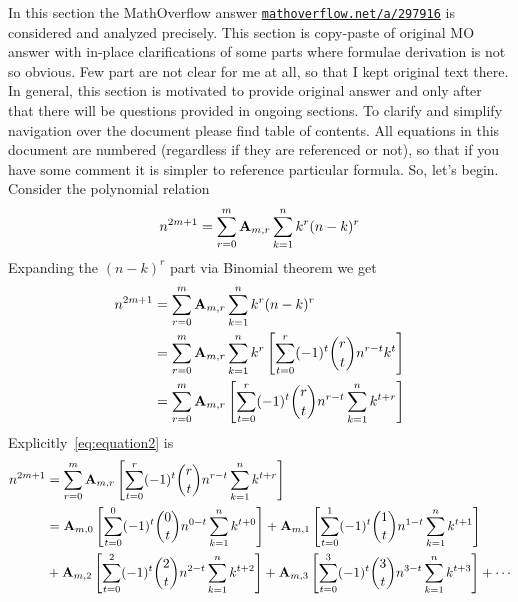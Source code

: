 In this section the MathOverflow answer \href{https://mathoverflow.net/a/297916}{\texttt{mathoverflow.net/a/297916}}
is considered and analyzed precisely.
This section is copy-paste of original MO answer with in-place clarifications of some parts where formulae derivation is
not so obvious.
Few part are not clear for me at all, so that I kept original text there.
In general, this section is motivated to provide original answer and only after that there will be questions provided in
ongoing sections.
To clarify and simplify navigation over the document please find table of contents.
All equations in this document are numbered (regardless if they are referenced or not), so that if you have some comment
it is simpler to reference particular formula.
So, let's begin.
Consider the polynomial relation
\begin{equation}
    n^{2m+1} = \sum_{r=0}^{m} {\mathbf{A}} \sb{m,r} \sum_{k=1}^{n} k^{r} (n-k)^{r}\label{eq:odd-power-identity}
\end{equation}
Expanding the $(n-k)^r$ part via Binomial theorem we get
\begin{equation}
    \begin{split}
        n^{2m+1} &= \sum_{r=0}^{m} {\mathbf{A}} \sb{m,r} \sum_{k=1}^{n} k^{r} (n-k)^{r} \\
        &= \sum_{r=0}^{m} {\mathbf{A}} \sb{m,r} \sum_{k=1}^{n} k^{r} \left[ \sum_{t=0}^{r} (-1)^t \binom{r}{t} n^{r-t} k^{t} \right] \\
        &= \sum_{r=0}^{m} {\mathbf{A}} \sb{m,r} \left[ \sum_{t=0}^{r} (-1)^t \binom{r}{t} n^{r-t} \sum_{k=1}^{n} k^{t+r} \right] \\
    \end{split}\label{eq:equation2}
\end{equation}
Explicitly~\eqref{eq:equation2} is
\begin{equation}
    \begin{split}
        n^{2m+1}
        &= \sum_{r=0}^{m} {\mathbf{A}} \sb{m,r} \left[ \sum_{t=0}^{r} (-1)^t \binom{r}{t} n^{r-t} \sum_{k=1}^{n} k^{t+r} \right] \\
        &= {\mathbf{A}} \sb{m,0} \left[ \sum_{t=0}^{0} (-1)^t \binom{0}{t} n^{0-t} \sum_{k=1}^{n} k^{t+0} \right]
        + {\mathbf{A}} \sb{m,1} \left[ \sum_{t=0}^{1} (-1)^t \binom{1}{t} n^{1-t} \sum_{k=1}^{n} k^{t+1} \right] \\
        &+ {\mathbf{A}} \sb{m,2} \left[ \sum_{t=0}^{2} (-1)^t \binom{2}{t} n^{2-t} \sum_{k=1}^{n} k^{t+2} \right]
        + {\mathbf{A}} \sb{m,3} \left[ \sum_{t=0}^{3} (-1)^t \binom{3}{t} n^{3-t} \sum_{k=1}^{n} k^{t+3} \right] + \cdots \\
    \end{split}\label{eq:equation13}
\end{equation}
